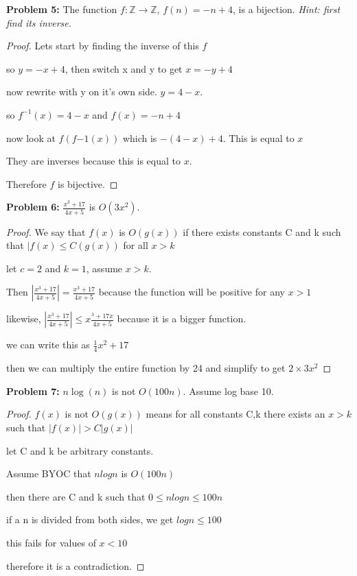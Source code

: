\documentclass[12pt]{article}
\def\Z{\mathbb Z}
\begin{document}
{\bf Problem 5:} The function $f:\Z \rightarrow \Z$, $f(n)=-n + 4$, is a bijection. \textit{Hint: first find its inverse.} \\

\begin{proof}

    Lets start by finding the inverse of this $f$

    so $y=-x+4$, then switch x and y to get $x=-y+4$

    now rewrite with y on it's own side. $y=4-x$.

    so $f^{-1}(x)=4-x$ and $f(x)=-n+4$

    now look at $f(f{-1}(x))$ which is $-(4-x)+4$. This is equal to $x$

    They are inverses because this is equal to $x$.

    Therefore $f$ is bijective.

\end{proof}

{\bf Problem 6:} $\frac{x^3+17}{4x+5}$ is $O(3x^2)$. \\

\begin{proof}

    We say that $f(x)$ is $O(g(x))$ if there exists constants C and k such that $|f(x)\le C(g(x))$ for all $x>k$

    let $c=2$ and $k=1$, assume $x>k$.

    Then $|\frac{x^3+17}{4x+5}|=\frac{x^3+17}{4x+5}$ because the function will be positive for any $x>1$

    likewise, $|\frac{x^3+17}{4x+5}|\leq x\frac{^3+17x}{4x+5}$ because it is a bigger function.

    we can write this as $\frac{1}{4}x^2+17$

    then we can multiply the entire function by 24 and simplify to get $2\times 3x^2$

\end{proof}

{\bf Problem 7:} $n \log(n)$ is not $O(100 n)$. Assume log base 10.\\

\begin{proof}

    $f(x)$ is not $O(g(x))$ means for all constants C,k there exists an $x>k$ such that $|f(x)| > C|g(x)|$

    let C and k be arbitrary constants.

    Assume BYOC that $nlogn$ is $O(100n)$

    then there are C and k such that $0\le nlogn \le 100n$

    if a n is divided from both sides, we get $logn\le 100$

    this fails for  values of $x<10$

    therefore it is a contradiction.

\end{proof}
\end{document}
